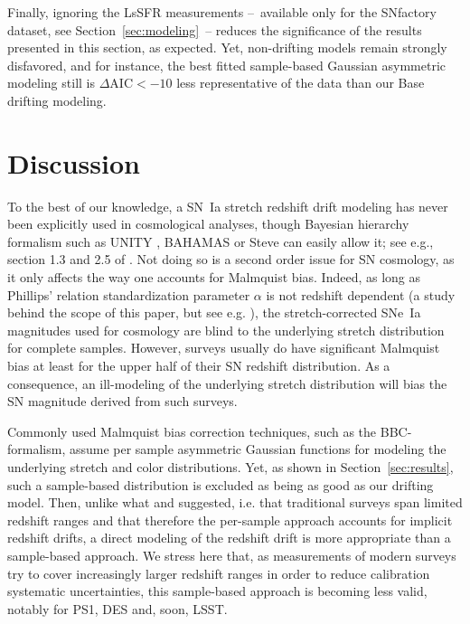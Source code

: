 \documentclass[]{aa}
\begin{document}
Finally, ignoring the LsSFR measurements --~available only for the SNfactory
dataset, see Section~\ref{sec:modeling}~-- reduces the significance of the
results presented in this section, as expected. Yet, non-drifting models remain
strongly disfavored, and for instance, the best fitted sample-based Gaussian
asymmetric modeling still is $\Delta\mathrm{AIC}<-10$ less representative of the
data than our Base drifting modeling.

\section{Discussion}\label{sec:discussion}

To the best of our knowledge, a SN~Ia stretch redshift drift modeling has never
been explicitly used in cosmological analyses, though Bayesian hierarchy
formalism such as UNITY \citep{rubin2015}, BAHAMAS \citep{shariff2016} or Steve
\citep{hinton2019} can easily allow it; see e.g., section 1.3 and 2.5 of
\cite{rubin2015}. Not doing so is a second order issue for SN cosmology, as it
only affects the way one accounts for Malmquist bias. Indeed, as long as
Phillips' relation \citep{phillips1993} standardization parameter $\alpha$ is
not redshift dependent (a study behind the scope of this paper, but see e.g.
\citealt{scolnic2018a}), the stretch-corrected SNe~Ia magnitudes used for
cosmology are blind to the underlying stretch distribution for complete samples.
However, surveys usually do have significant Malmquist bias at least for the
upper half of their SN redshift distribution. As a consequence, an ill-modeling
of the underlying stretch distribution will bias the SN magnitude derived from
such surveys. 

Commonly used Malmquist bias correction techniques, such as the BBC-formalism,
assume per sample asymmetric Gaussian functions for modeling the underlying
stretch and color distributions. Yet, as shown in Section~\ref{sec:results},
such a sample-based distribution is excluded as being as good as our drifting
model. Then, unlike what \citet[][Section~2]{scolnic2016} and
\citet[][Section~5.4]{scolnic2018a} suggested, i.e. that traditional surveys
span limited redshift ranges and that therefore the per-sample approach accounts
for implicit redshift drifts, a direct modeling of the redshift drift is more
appropriate than a sample-based approach. We stress here that, as measurements
of modern surveys try to cover increasingly larger redshift ranges in order to
reduce calibration systematic uncertainties, this sample-based approach is
becoming less valid, notably for PS1, DES and, soon, LSST.
\end{document}
